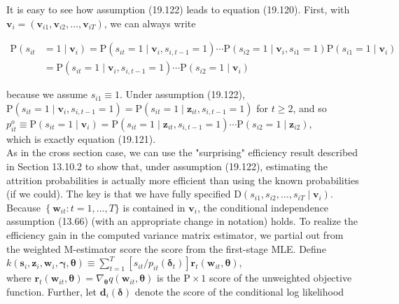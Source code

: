\documentclass[10pt]{article}
\begin{document}
It is easy to see how assumption (19.122) leads to equation (19.120). First, with $\mathbf{v}_{i}=\left(\mathbf{v}_{i 1}, \mathbf{v}_{i 2}, \ldots, \mathbf{v}_{i T}\right)$, we can always write


\begin{align*}
\mathrm{P}\left(s_{i t}\right. & \left.=1 \mid \mathbf{v}_{i}\right)=\mathrm{P}\left(s_{i t}=1 \mid \mathbf{v}_{i}, s_{i, t-1}=1\right) \cdots \mathrm{P}\left(s_{i 2}=1 \mid \mathbf{v}_{i}, s_{i 1}=1\right) \mathrm{P}\left(s_{i 1}=1 \mid \mathbf{v}_{i}\right) \\
& =\mathrm{P}\left(s_{i t}=1 \mid \mathbf{v}_{i}, s_{i, t-1}=1\right) \cdots \mathrm{P}\left(s_{i 2}=1 \mid \mathbf{v}_{i}\right) \tag{19.123}
\end{align*}


because we assume $s_{i 1} \equiv 1$. Under assumption (19.122), $\mathrm{P}\left(s_{i t}=1 \mid \mathbf{v}_{i}, s_{i, t-1}=1\right)= \mathrm{P}\left(s_{i t}=1 \mid \mathbf{z}_{i t}, s_{i, t-1}=1\right)$ for $t \geq 2$, and so\\
$p_{i t}^{o} \equiv \mathrm{P}\left(s_{i t}=1 \mid \mathbf{v}_{i}\right)=\mathrm{P}\left(s_{i t}=1 \mid \mathbf{z}_{i t}, s_{i, t-1}=1\right) \cdots \mathrm{P}\left(s_{i 2}=1 \mid \mathbf{z}_{i 2}\right)$,\\
which is exactly equation (19.121).\\
As in the cross section case, we can use the "surprising" efficiency result described in Section 13.10.2 to show that, under assumption (19.122), estimating the attrition probabilities is actually more efficient than using the known probabilities (if we could). The key is that we have fully specified $\mathrm{D}\left(s_{i 1}, s_{i 2}, \ldots, s_{i T} \mid \mathbf{v}_{i}\right)$. Because $\left\{\mathbf{w}_{i t}: t=\right. 1, \ldots, T\}$ is contained in $\mathbf{v}_{i}$, the conditional independence assumption (13.66) (with an appropriate change in notation) holds. To realize the efficiency gain in the computed variance matrix estimator, we partial out from the weighted M-estimator score the score from the first-stage MLE. Define\\
$k\left(\mathbf{s}_{i}, \mathbf{z}_{i}, \mathbf{w}_{i}, \boldsymbol{\gamma}, \boldsymbol{\theta}\right) \equiv \sum_{t=1}^{T}\left[s_{i t} / p_{i t}\left(\boldsymbol{\delta}_{t}\right)\right] \mathbf{r}_{t}\left(\mathbf{w}_{i t}, \boldsymbol{\theta}\right)$,\\
where $\mathbf{r}_{t}\left(\mathbf{w}_{i t}, \boldsymbol{\theta}\right)=\nabla_{\boldsymbol{\theta}} q\left(\mathbf{w}_{i t}, \boldsymbol{\theta}\right)$ is the $\mathrm{P} \times 1$ score of the unweighted objective function. Further, let $\mathbf{d}_{i}(\boldsymbol{\delta})$ denote the score of the conditional log likelihood
\end{document}
